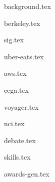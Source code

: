 \documentclass[11pt]{article}
\begin{document}
{background.tex}


{berkeley.tex}


{sig.tex}

{uber-eats.tex}

{aws.tex}

{cega.tex}

{voyager.tex}

{nci.tex}


{debate.tex}


{skills.tex}


{awards-gen.tex}
\end{document}
